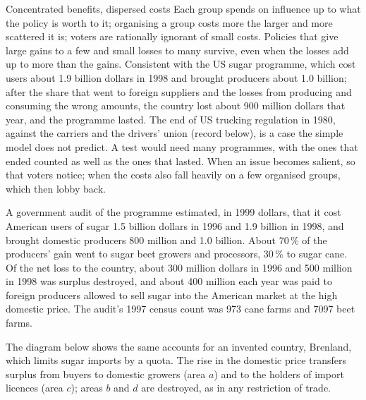 \begin{model}{Concentrated benefits, dispersed costs}
\assumes Each group spends on influence up to what the policy is worth to it; organising a group costs more the larger and more scattered it is; voters are rationally
  ignorant of small costs.
\predicts Policies that give large gains to a few and small losses to many survive, even when the losses add up to more than the gains.
\tested Consistent with the US sugar programme, which cost users about 1.9 billion dollars in 1998 and brought producers about 1.0 billion; after the share
  that went to foreign suppliers and the losses from producing and consuming the wrong amounts, the country lost about 900 million dollars that year, and
  the programme lasted. The end of US trucking regulation in 1980, against the carriers and the drivers' union (record below), is a case the simple model
  does not predict. A test would need many programmes, with the ones that ended counted as well as the ones that lasted.
\breaks When an issue becomes salient, so that voters notice; when the costs also fall heavily on a few organised groups, which then lobby back.
\end{model}

\begin{record}[Sugar in the United States]
A government audit of the programme estimated, in 1999 dollars, that it cost American users of sugar 1.5 billion dollars in 1996 and 1.9 billion in 1998, and brought
domestic producers 800 million and 1.0 billion. About 70\,\% of the producers' gain went to sugar beet growers and processors, 30\,\% to sugar cane. Of the net loss to
the country, about 300 million dollars in 1996 and 500 million in 1998 was surplus destroyed, and about 400 million each year was paid to foreign producers allowed to
sell sugar into the American market at the high domestic price. The audit's 1997 census count was 973 cane farms and 7097 beet farms.
\end{record}

The diagram below shows the same accounts for an invented country, Brenland, which limits sugar imports by a quota. The rise in the domestic price transfers surplus from
buyers to domestic growers (area $a$) and to the holders of import licences (area $c$); areas $b$ and $d$ are destroyed, as in any restriction of trade.

